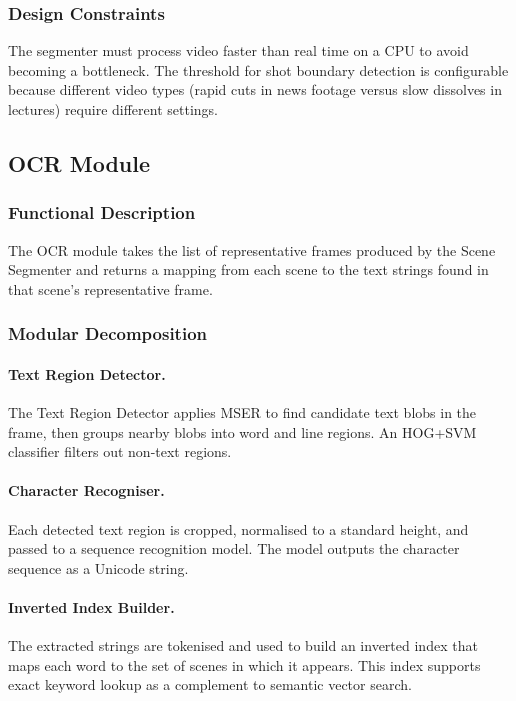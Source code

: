 \documentclass[12pt, a4paper]{report}
\begin{document}
\subsubsection{Design Constraints}

The segmenter must process video faster than real time on a CPU to avoid
becoming a bottleneck. The threshold for shot boundary detection is
configurable because different video types (rapid cuts in news footage
versus slow dissolves in lectures) require different settings.

\subsection{OCR Module}

\subsubsection{Functional Description}

The OCR module takes the list of representative frames produced by the
Scene Segmenter and returns a mapping from each scene to the text strings
found in that scene's representative frame.

\subsubsection{Modular Decomposition}

\paragraph{Text Region Detector.}
The Text Region Detector applies MSER to find candidate text blobs in the
frame, then groups nearby blobs into word and line regions. An HOG+SVM
classifier filters out non-text regions.

\paragraph{Character Recogniser.}
Each detected text region is cropped, normalised to a standard height, and
passed to a sequence recognition model. The model outputs the character
sequence as a Unicode string.

\paragraph{Inverted Index Builder.}
The extracted strings are tokenised and used to build an inverted index that
maps each word to the set of scenes in which it appears. This index supports
exact keyword lookup as a complement to semantic vector search.
\end{document}
